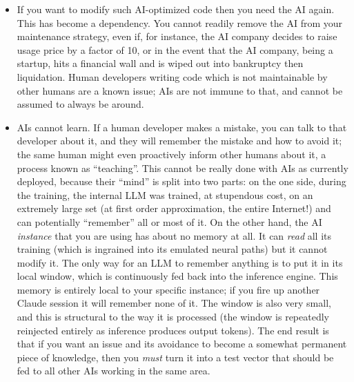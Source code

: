 \documentclass{llncs}
\begin{document}
\begin{itemize}

    \item If you want to modify such AI-optimized code then you need the
    AI again. This has become a dependency. You cannot readily remove
    the AI from your maintenance strategy, even if, for instance, the AI
    company decides to raise usage price by a factor of 10, or in the
    event that the AI company, being a startup, hits a financial wall
    and is wiped out into bankruptcy then liquidation. Human developers
    writing code which is not maintainable by other humans are a known
    issue; AIs are not immune to that, and cannot be assumed to always
    be around.

    \item AIs cannot learn. If a human developer makes a mistake, you
    can talk to that developer about it, and they will remember the
    mistake and how to avoid it; the same human might even proactively
    inform other humans about it, a process known as ``teaching''. This
    cannot be really done with AIs as currently deployed, because their
    ``mind'' is split into two parts: on the one side, during the
    training, the internal LLM was trained, at stupendous cost, on an
    extremely large set (at first order approximation, the entire
    Internet!) and can potentially ``remember'' all or most of it. On
    the other hand, the AI \emph{instance} that you are using has about
    no memory at all. It can \emph{read} all its training (which is
    ingrained into its emulated neural paths) but it cannot modify it.
    The only way for an LLM to remember anything is to put it in its
    local window, which is continuously fed back into the inference
    engine. This memory is entirely local to your specific instance; if
    you fire up another Claude session it will remember none of it. The
    window is also very small, and this is structural to the way it is
    processed (the window is repeatedly reinjected entirely as inference
    produces output tokens). The end result is that if you want an issue
    and its avoidance to become a somewhat permanent piece of knowledge,
    then you \emph{must} turn it into a test vector that should be fed
    to all other AIs working in the same area.


\end{itemize}
\end{document}
